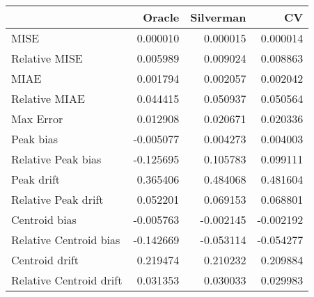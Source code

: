 \begin{tabular}{lrrr}
  \hline
 & Oracle & Silverman & CV \\ 
  \hline
MISE & 0.000010 & 0.000015 & 0.000014 \\ 
  Relative MISE & 0.005989 & 0.009024 & 0.008863 \\ 
  MIAE & 0.001794 & 0.002057 & 0.002042 \\ 
  Relative MIAE & 0.044415 & 0.050937 & 0.050564 \\ 
  Max Error & 0.012908 & 0.020671 & 0.020336 \\ 
  Peak bias & -0.005077 & 0.004273 & 0.004003 \\ 
  Relative Peak bias & -0.125695 & 0.105783 & 0.099111 \\ 
  Peak drift & 0.365406 & 0.484068 & 0.481604 \\ 
  Relative Peak drift & 0.052201 & 0.069153 & 0.068801 \\ 
  Centroid bias & -0.005763 & -0.002145 & -0.002192 \\ 
  Relative Centroid bias & -0.142669 & -0.053114 & -0.054277 \\ 
  Centroid drift & 0.219474 & 0.210232 & 0.209884 \\ 
  Relative Centroid drift & 0.031353 & 0.030033 & 0.029983 \\ 
   \hline
\end{tabular}
